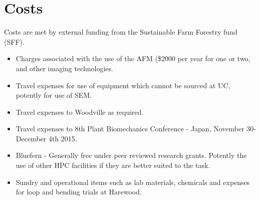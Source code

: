 \section{Costs}
Costs are met by external funding from the Sustainable Farm Forestry fund (SFF).
\begin{itemize}
\item Charges associated with the use of the AFM (\$2000 per year for one or two, and other imaging technologies.
\end{itemize}

\begin{itemize}
\item Travel expenses for use of equipment which cannot be sourced at UC, potently for
use of SEM.
\end{itemize}

\begin{itemize}
\item Travel expenses to Woodville as required.
\end{itemize}
\begin{itemize}
\item Travel expenses to 8th Plant Biomechanics Conference - Japan, November
30-December 4th 2015.
\end{itemize}

\begin{itemize}
\item Bluefern - Generally free under peer reviewed research grants. Potently the use
of other HPC facilities if they are better suited to the task.
\end{itemize}

\begin{itemize}
\item Sundry and operational items such as lab materials, chemicals and expenses for
loop and bending trials at Harewood.
\end{itemize}
